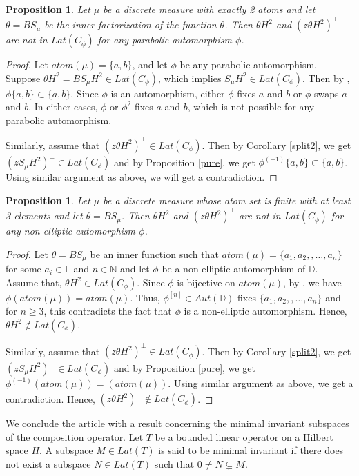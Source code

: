 \documentclass[12pt, reqno]{amsart}
\newtheorem{proposition}[theorem]{Proposition}
\theoremstyle{definition}
\numberwithin{equation}{section}
\begin{document}
\begin{proposition}
		Let $\mu$ be  a discrete measure with exactly 2 atoms and let $\theta=BS_\mu$ be the inner factorization of the function $\theta$. Then $\theta H^2$ and $(z\theta H^2)^\perp$ are not in $Lat (C_\phi)$ for any parabolic automorphism $\phi$.
\end{proposition}
\begin{proof}

	
	Let $atom(\mu)=\{a,b\}$, and let $\phi$ be any parabolic automorphism.  Suppose $\theta H^2=BS_\mu H^2\in Lat (C_\phi)$, which  implies $S_\mu H^2 \in Lat (C_\phi)$. Then by  \cite[Corollary 2.15]{valentine}, $\phi\{a,b\}\subset\{a,b\}$. Since $\phi$ is an automorphism, either $\phi$ fixes $a$ and $b$ or $\phi$ swaps $a$ and $b$. In either cases, $\phi$ or $\phi^2$ fixes $a$ and $b$, which is not possible for any parabolic automorphism.  
	
	Similarly, assume that $(z\theta H^2)^\perp\in Lat (C_\phi)$. Then by Corollary \ref{split2}, we get 
	$(zS_\mu H^2)^\perp\in Lat (C_\phi)$ and by Proposition \ref{pure}, we get  $\phi^{(-1)}\{a,b\}\subset\{a,b\}$. Using  similar argument as above, we will get a contradiction.
	
\end{proof}
\begin{proposition}
	Let $\mu$ be  a discrete measure  whose atom set is finite with at least 3 elements and let $\theta=BS_\mu$. Then $\theta H^2$ and $(z\theta H^2)^\perp$ are not in $Lat (C_\phi)$ for any non-elliptic automorphism $\phi$.
\end{proposition}                                                  \begin{proof}
	Let $\theta=BS_\mu$ be an inner function such that $atom(\mu)=\{a_1, a_2, ,…,a_n\}$ for some $a_i \in \mathbb{T}$ and $n \in \mathbb{N}$ and let $\phi$ be a non-elliptic automorphism of $\mathbb{D}$. Assume that, $\theta H^2\in Lat (C_\phi)$. Since  $\phi$ is bijective on $atom(\mu)$, by \cite[Corollary 2.15]{valentine}, we have $\phi(atom(\mu))=atom(\mu)$. Thus, $\phi^{[n]}\in Aut(\mathbb{D})$ fixes $\{a_1, a_2, ,…,a_n\}$ and for $n\geq3$, this contradicts the fact that $\phi$ is a non-elliptic automorphism. Hence, $\theta H^2\notin Lat (C_\phi)$. 
	
	Similarly, assume that $(z\theta H^2)^\perp\in Lat (C_\phi)$. Then by Corollary \ref{split2}, we get 
	$(zS_\mu H^2)^\perp\in Lat (C_\phi)$ and by Proposition \ref{pure},  we get
	$\phi^{(-1)}(atom(\mu))= (atom(\mu))$. Using similar argument as above, we get a contradiction. Hence, $(z\theta H^2)^\perp \notin Lat (C_\phi)$.
\end{proof}
We conclude the article with a result concerning the minimal invariant subspaces of the composition operator.
Let $T$ be a bounded linear operator on a Hilbert space $H$. A subspace $M \in Lat(T)$ is said to be minimal invariant if there does not exist a subspace $N \in Lat(T)$ such that ${0}\neq N\subsetneq M$.
\end{document}
